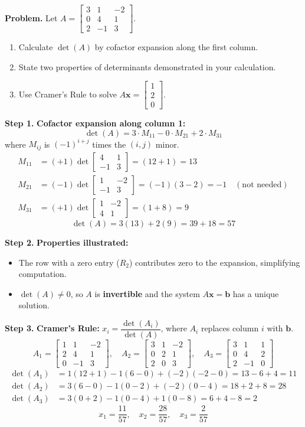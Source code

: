 \documentclass[12pt,a4paper]{article}
\newcommand{\step}[1]{\noindent\textbf{Step #1.}\;}
\newcommand{\mat}[1]{\begin{bmatrix}#1\end{bmatrix}}
\begin{document}
	\begin{tcolorbox}[worked]
		\textbf{Problem.} Let $A = \mat{3 & 1 & -2 \\ 0 & 4 & 1 \\ 2 & -1 & 3}$.
		
		\begin{enumerate}[label=(\alph*), nosep]
			\item Calculate $\det(A)$ by cofactor expansion along the first column.
			\item State two properties of determinants demonstrated in your calculation.
			\item Use Cramer's Rule to solve $A\mathbf{x} = \mat{1\\2\\0}$.
		\end{enumerate}
		
		\step{1} \textbf{Cofactor expansion along column 1:}
		\[
		\det(A) = 3\cdot M_{11} - 0\cdot M_{21} + 2\cdot M_{31}
		\]
		where $M_{ij}$ is $(-1)^{i+j}$ times the $(i,j)$ minor.
		\begin{align*}
			M_{11} &= (+1)\det\mat{4&1\\-1&3} = (12+1) = 13 \\
			M_{21} &= (-1)\det\mat{1&-2\\-1&3} = (-1)(3-2) = -1 \quad(\text{not needed}) \\
			M_{31} &= (+1)\det\mat{1&-2\\4&1} = (1+8) = 9
		\end{align*}
		\[
		\det(A) = 3(13) + 2(9) = 39 + 18 = \boxed{57}
		\]
		
		\step{2} \textbf{Properties illustrated:}
		\begin{itemize}[nosep]
			\item The row with a zero entry ($R_2$) contributes zero to the expansion, simplifying computation.
			\item $\det(A) \neq 0$, so $A$ is \textbf{invertible} and the system $A\mathbf{x}=\mathbf{b}$ has a unique solution.
		\end{itemize}
		
		\step{3} \textbf{Cramer's Rule:} $x_i = \dfrac{\det(A_i)}{\det(A)}$, where $A_i$ replaces column $i$ with $\mathbf{b}$.
		\[
		A_1 = \mat{1&1&-2\\2&4&1\\0&-1&3},\quad
		A_2 = \mat{3&1&-2\\0&2&1\\2&0&3},\quad
		A_3 = \mat{3&1&1\\0&4&2\\2&-1&0}
		\]
		\begin{align*}
			\det(A_1) &= 1(12+1)-1(6-0)+(-2)(-2-0) = 13-6+4 = 11 \\
			\det(A_2) &= 3(6-0)-1(0-2)+(-2)(0-4) = 18+2+8 = 28 \\
			\det(A_3) &= 3(0+2)-1(0-4)+1(0-8) = 6+4-8 = 2
		\end{align*}
		\[
		x_1 = \frac{11}{57},\quad x_2 = \frac{28}{57},\quad x_3 = \frac{2}{57}
		\]
	\end{tcolorbox}
	
\end{document}

